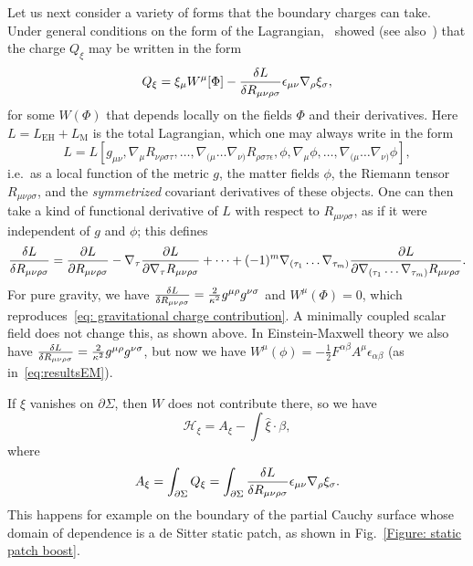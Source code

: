 \documentclass[]{jkpaper}
\theoremstyle{plain}
\theoremstyle{definition}
\begin{document}
Let us next consider a variety of forms that the boundary charges can take. Under general conditions on the form of the Lagrangian,~\cite{Iyer:1994ys} showed (see also~\cite{Fursaev:1998hr}) that the charge $Q_\xi$ may be written in the form
\begin{equation}
    Q_\xi = \xi_\mu W^\mu[\Phi] - \fdv{L}{R_{\mu\nu\rho\sigma}}\epsilon_{\mu\nu}\nabla_\rho\xi_\sigma,
\end{equation}
for some $W(\Phi)$ that depends locally on the fields $\Phi$ and their derivatives. Here $L=L_{\text{EH}}+L_{\text{M}}$ is the total Lagrangian, which one may always write in the form
\begin{equation}
    L = L[g_{\mu\nu}, \nabla_\mu R_{\nu\rho\sigma\tau}, \dots,\nabla_{(\mu}\dots\nabla_{\nu)}R_{\rho\sigma\tau\epsilon},\phi,\nabla_\mu\phi,\dots,\nabla_{(\mu}\dots\nabla_{\nu)}\phi],
\end{equation}
i.e.\ as a local function of the metric $g$, the matter fields $\phi$, the Riemann tensor $R_{\mu\nu\rho\sigma}$, and the \emph{symmetrized} covariant derivatives of these objects. One can then take a kind of functional derivative of $L$ with respect to $R_{\mu\nu\rho\sigma}$, as if it were independent of $g$ and $\phi$; this defines
\begin{equation}
    \fdv{L}{R_{\mu\nu\rho\sigma}} = \pdv{L}{R_{\mu\nu\rho\sigma}}-\nabla_\tau\pdv{L}{\nabla_\tau R_{\mu\nu\rho\sigma}} + \dots + (-1)^m \nabla_{(\tau_1}\dots\nabla_{\tau_m)}\pdv{L}{\nabla_{(\tau_1}\dots\nabla_{\tau_m)}R_{\mu\nu\rho\sigma}}.
\end{equation}
For pure gravity, we have $\fdv{L}{R_{\mu\nu\rho\sigma}}= \frac2{\kappa^2}g^{\mu\rho}g^{\nu\sigma}$ and $W^\mu(\Phi)=0$, which reproduces~\eqref{eq: gravitational charge contribution}. A minimally coupled scalar field does not change this, as shown above. In Einstein-Maxwell theory we also have $\fdv{L}{R_{\mu\nu\rho\sigma}}= \frac2{\kappa^2}g^{\mu\rho}g^{\nu\sigma}$, but now we have $W^\mu(\phi)= -\frac12 F^{\alpha\beta}A^\mu\epsilon_{\alpha\beta}$ (as in~\eqref{eq:resultsEM}).

If $\xi$ vanishes on $\partial\Sigma$, then $W$ does not contribute there, so we have
\begin{equation}
    \mathcal{H}_\xi = A_\xi - \int \hat{\xi}\cdot\beta,
\end{equation}
where
\begin{equation}
    A_\xi = \int_{\partial\Sigma} Q_\xi = \int_{\partial\Sigma}\fdv{L}{R_{\mu\nu\rho\sigma}}\epsilon_{\mu\nu}\nabla_\rho\xi_\sigma.
\end{equation}
This happens for example on the boundary of the partial Cauchy surface whose domain of dependence is a de Sitter static patch, as shown in Fig.~\ref{Figure: static patch boost}.
\end{document}
